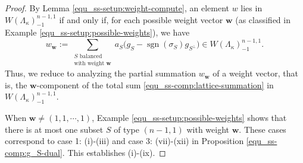 \documentclass[pdflatex,sn-mathphys-num]{sn-jnl}%
\theoremstyle{thmstyleone}%
\theoremstyle{thmstyletwo}%
\numberwithin{equation}{subsection}
\theoremstyle{thmstylethree}%
\newcommand{\bw}{\ensuremath{\mathbf{w}}\xspace}
\DeclareMathOperator{\sgn}{sgn}
\begin{document}
\begin{proof}
By Lemma \ref{equ_ss-setup:weight-compute}, an element $w$ lies in $W(\Lambda_\kappa)_{-1}^{n-1,1}$ if and only if, for each possible weight vector $\mathbf{w}$ (as classified in Example \ref{equ_ss-setup:possible-weights}), we have
\begin{equation*}
	w_{\bw}:=\sum_{\substack{S \text{ balanced}\\ \text{with weight }\mathbf{w}}}a_S\bigl(g_S - \sgn(\sigma_S) g_{S^\perp}\bigr) \in W(\Lambda_\kappa)_{-1}^{n-1,1}.
\end{equation*}
Thus, we reduce to analyzing the partial summation $w_\bw$ of a weight vector, that is, the $\bw$-component of the total sum \eqref{equ_ss-comp:lattice-summation} in $W(\Lambda_\kappa)_{-1}^{n-1,1}$.
			
When $\mathbf{w}\neq (1,1,\cdots,1)$, Example \ref{equ_ss-setup:possible-weights} shows that there is at most one subset $S$ of type $(n-1,1)$ with weight $\mathbf{w}$. These cases correspond to case 1: (i)-(iii) and case 3: (vii)-(xii) in Proposition \ref{equ_ss-comp:g_S-dual}. This establishes (i)-(ix).
			

\end{proof}
\end{document}
